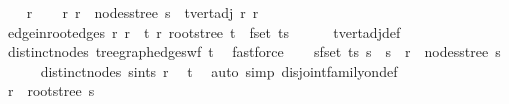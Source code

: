 \begin{isabellebody}
\isanewline
\ \ \isamarkupfalse%
\ r{\isacharprime}{\kern0pt}\isanewline
\ \ \isamarkupfalse%
\ r{\isacharprime}{\kern0pt}{\isacharcolon}{\kern0pt}\ {\isachardoublequoteopen}r{\isacharprime}{\kern0pt}\ {\isasymin}\ nodes{\isacharunderscore}{\kern0pt}stree\ s\ {\isasymand}\ t{\isachardot}{\kern0pt}vert{\isacharunderscore}{\kern0pt}adj\ r\ r{\isacharprime}{\kern0pt}{\isachardoublequoteclose}\isanewline
\ \ \isamarkupfalse%
\ \isamarkupfalse%
\ edge{\isacharunderscore}{\kern0pt}in{\isacharunderscore}{\kern0pt}root{\isacharunderscore}{\kern0pt}edges{\isacharcolon}{\kern0pt}\ {\isachardoublequoteopen}{\isacharbraceleft}{\kern0pt}r{\isacharcomma}{\kern0pt}\ r{\isacharprime}{\kern0pt}{\isacharbraceright}{\kern0pt}\ {\isasymin}\ {\isacharparenleft}{\kern0pt}{\isasymlambda}t{\isachardot}{\kern0pt}\ {\isacharbraceleft}{\kern0pt}r{\isacharcomma}{\kern0pt}\ root{\isacharunderscore}{\kern0pt}stree\ t{\isacharbraceright}{\kern0pt}{\isacharparenright}{\kern0pt}\ {\isacharbackquote}{\kern0pt}\ fset\ ts{\isachardoublequoteclose}\isanewline
\ \ \ \ \isamarkupfalse%
\ t{\isachardot}{\kern0pt}vert{\isacharunderscore}{\kern0pt}adj{\isacharunderscore}{\kern0pt}def\ \isamarkupfalse%
\ distinct{\isacharunderscore}{\kern0pt}nodes\ tree{\isacharunderscore}{\kern0pt}graph{\isacharunderscore}{\kern0pt}edges{\isacharunderscore}{\kern0pt}wf\ t\ \isamarkupfalse%
\ fastforce\isanewline
\ \ \isamarkupfalse%
\ {\isachardoublequoteopen}{\isasymforall}s{\isacharprime}{\kern0pt}{\isasymin}fset\ ts{\isachardot}{\kern0pt}\ s{\isacharprime}{\kern0pt}\ {\isasymnoteq}\ s\ {\isasymlongrightarrow}\ r{\isacharprime}{\kern0pt}\ {\isasymnotin}\ nodes{\isacharunderscore}{\kern0pt}stree\ s{\isacharprime}{\kern0pt}{\isachardoublequoteclose}\isanewline
\ \ \ \ \isamarkupfalse%
\ distinct{\isacharunderscore}{\kern0pt}nodes\ s{\isacharunderscore}{\kern0pt}in{\isacharunderscore}{\kern0pt}ts\ r{\isacharprime}{\kern0pt}\ \isamarkupfalse%
\ t\ \isamarkupfalse%
\ {\isacharparenleft}{\kern0pt}auto\ simp{\isacharcolon}{\kern0pt}\ disjoint{\isacharunderscore}{\kern0pt}family{\isacharunderscore}{\kern0pt}on{\isacharunderscore}{\kern0pt}def{\isacharparenright}{\kern0pt}\isanewline
\ \ \isamarkupfalse%
\ \isamarkupfalse%
\ {\isachardoublequoteopen}r{\isacharprime}{\kern0pt}\ {\isacharequal}{\kern0pt}\ root{\isacharunderscore}{\kern0pt}stree\ s{\isachardoublequoteclose}\ \isamarkupfalse%

\end{isabellebody}
